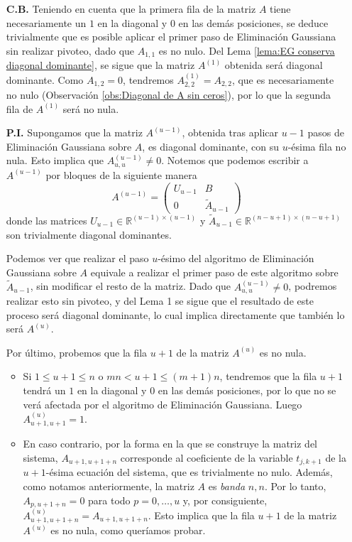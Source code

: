         \begin{itemize}
          \item[\textbf{C.B.}] Teniendo en cuenta que la primera fila de la matriz $A$ tiene necesariamente un $1$ en la diagonal y $0$ en las demás posiciones, se deduce trivialmente que es posible aplicar el primer paso de Eliminación Gaussiana sin realizar pivoteo, dado que $A_{1, 1}$ es no nulo. Del Lema \ref{lema:EG conserva diagonal dominante}, se sigue que la matriz $A^{(1)}$ obtenida será diagonal dominante. Como $A_{1, 2} = 0$, tendremos $A^{(1)}_{2,2} = A_{2,2}$, que es necesariamente no nulo (Observación \ref{obs:Diagonal de A sin ceros}), por lo que la segunda fila de $A^{(1)}$ será no nula.
              
          \item[\textbf{P.I.}] Supongamos que la matriz $A^{(u - 1)}$, obtenida tras aplicar $u - 1$ pasos de Eliminación Gaussiana sobre $A$, es diagonal dominante, con su $u$-ésima fila no nula. Esto implica que $A^{(u - 1)}_{u,u} \neq 0$. Notemos que podemos escribir a $A^{(u - 1)}$ por bloques de la siguiente manera
            \[ A^{(u - 1)} = \left( \begin{matrix} U_{u - 1} & B \\ 0 & \widetilde{A}_{u - 1} \end{matrix} \right) \]
          donde las matrices $U_{u - 1} \in \mathbb{R}^{(u-1)\times(u-1)}$ y $\widetilde{A}_{u - 1} \in \mathbb{R}^{(n-u+1)\times(n-u+1)}$ son trivialmente diagonal dominantes.

          Podemos ver que realizar el paso $u$-ésimo del algoritmo de Eliminación Gaussiana sobre $A$ equivale a realizar el primer paso de este algoritmo sobre $\widetilde{A}_{u - 1}$, sin modificar el resto de la matriz. Dado que $A^{(u - 1)}_{u,u} \neq 0$, podremos realizar esto sin pivoteo, y del Lema 1 se sigue que el resultado de este proceso será diagonal dominante, lo cual implica directamente que también lo será $A^{(u)}$.

          Por último, probemos que la fila $u + 1$ de la matriz $A^{(u)}$ es no nula.
          \begin{itemize}
            \item Si $1 \leq u + 1 \leq n$ o $mn < u + 1 \leq (m+1)n$, tendremos que la fila $u + 1$ tendrá un $1$ en la diagonal y $0$ en las demás posiciones, por lo que no se verá afectada por el algoritmo de Eliminación Gaussiana. Luego $A^{(u)}_{u+1,u+1} = 1$.
            \item En caso contrario, por la forma en la que se construye la matriz del sistema, $A_{u+1,u+1+n}$ corresponde al coeficiente de la variable $t_{j,k+1}$ de la $u + 1$-ésima ecuación del sistema, que es trivialmente no nulo. Además, como notamos anteriormente, la matriz $A$ es \emph{banda} $n, n$. Por lo tanto, $A_{p,u+1+n} = 0$ para todo $p = 0, \dots, u$ y, por consiguiente, $A^{(u)}_{u+1,u+1+n} = A_{u+1,u+1+n}$. Esto implica que la fila $u + 1$ de la matriz $A^{(u)}$ es no nula, como queríamos probar. \qedhere
          \end{itemize}
        \end{itemize}

